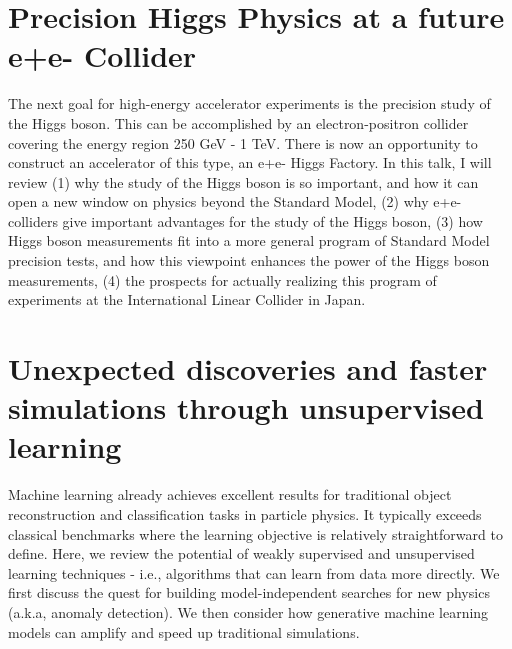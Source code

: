 \documentclass[12pt, a4paper, notitlepage, onecolumn]{article}
\begin{document}
\section{Precision Higgs Physics at a future e+e- Collider}
\noindent The next goal for high-energy accelerator experiments is the precision study of the Higgs boson. This can be accomplished by an electron-positron collider covering the energy region 250 GeV - 1 TeV. There is now an opportunity to construct an accelerator of this type, an e+e- Higgs Factory. In this talk, I will review (1) why the study of the Higgs boson is so important, and how it can open a new window on physics beyond the Standard Model, (2) why e+e- colliders give important advantages for the study of the Higgs boson, (3) how Higgs boson measurements fit into a more general program of Standard Model precision tests, and how this viewpoint enhances the power of the Higgs boson measurements, (4) the prospects for actually realizing this program of experiments at the International Linear Collider in Japan.

\section{Unexpected discoveries and faster simulations through unsupervised learning}
\noindent Machine learning already achieves excellent results for traditional object reconstruction and classification tasks in particle physics. It typically exceeds classical benchmarks where the learning objective is relatively straightforward to define. Here, we review the potential of weakly supervised and unsupervised learning techniques - i.e., algorithms that can learn from data more directly.  We first discuss the quest for building model-independent searches for new physics (a.k.a, anomaly detection). We then consider how generative machine learning models can amplify and speed up traditional simulations.
\end{document}
